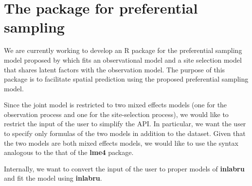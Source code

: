 \section{The package for preferential sampling}
We are currently working to develop an R package for the preferential sampling model proposed
by \cite{Watson2019_pref_samp} which fits an observational model and a site selection model
that shares latent factors with the observation model. 
The purpose of this package is to facilitate spatial prediction using the proposed preferential
sampling model.

Since the joint model is restricted to two mixed effects models (one for the observation process 
and one for the site-selection process),  we would like to restrict the input of the user to simplify the API. 
In particular, we want the user to specify only formulas of the two models in addition to the dataset. 
Given that the two models are both mixed effects models, we would like to use the syntax
analogous to the that of the \textbf{lme4} package.

Internally, we want to convert the input of the user to proper models of \textbf{inlabru} and fit
the model using \textbf{inlabru}.

%
%


